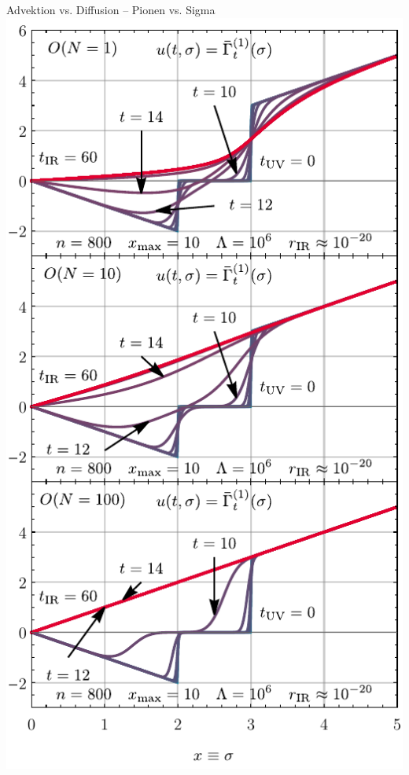 \begin{frame}{Advektion vs. Diffusion -- Pionen vs. Sigma}
	\label{0dadvection}
	\centering
	\includegraphics[width=0.38\framewidth]{../0d/figures/sc_i_on_1_10_100_n_800_xmax_10_lambda_1e6_tir_60_rg_flow.pdf}
\end{frame}

